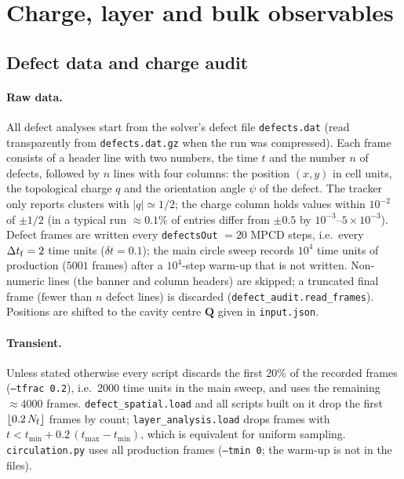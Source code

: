 \section{Charge, layer and bulk observables}\label{sec:m-charge}

\subsection{Defect data and charge audit}
\label{sec:methods-audit}

\paragraph{Raw data.}
All defect analyses start from the solver's defect file \texttt{defects.dat}
(read transparently from \texttt{defects.dat.gz} when the run was compressed).
Each frame consists of a header line with two numbers, the time $t$ and the number
$n$ of defects, followed by $n$ lines with four columns: the position $(x,y)$ in
cell units, the topological charge $q$ and the orientation angle $\psi$ of the defect.
The tracker only reports clusters with $|q|\simeq 1/2$; the charge column holds
values within $10^{-2}$ of $\pm 1/2$ (in a typical run $\approx 0.1\%$ of entries
differ from $\pm0.5$ by $10^{-3}$--$5\times10^{-3}$). Defect frames are written every
\texttt{defectsOut} $=20$ MPCD steps, i.e.\ every $\Delta t_{\rm f}=2$ time units
($\delta t = 0.1$); the main circle sweep records $10^4$ time units of production
($5001$ frames) after a $10^4$-step warm-up that is not written.
Non-numeric lines (the banner and column headers) are skipped; a truncated final frame
(fewer than $n$ defect lines) is discarded (\texttt{defect\_audit.read\_frames}).
Positions are shifted to the cavity centre $\mathbf{Q}$ given in \texttt{input.json}.

\paragraph{Transient.}
Unless stated otherwise every script discards the first $20\%$ of the recorded frames
(\texttt{--tfrac 0.2}), i.e.\ $2000$ time units in the main sweep, and uses the remaining
$\approx 4000$ frames. \texttt{defect\_spatial.load} and all scripts built on it drop
the first $\lfloor 0.2\,N_{\rm f}\rfloor$ frames by count; \texttt{layer\_analysis.load}
drops frames with $t < t_{\min}+0.2\,(t_{\max}-t_{\min})$, which is equivalent for
uniform sampling. \texttt{circulation.py} uses all production frames (\texttt{--tmin 0};
the warm-up is not in the files).

